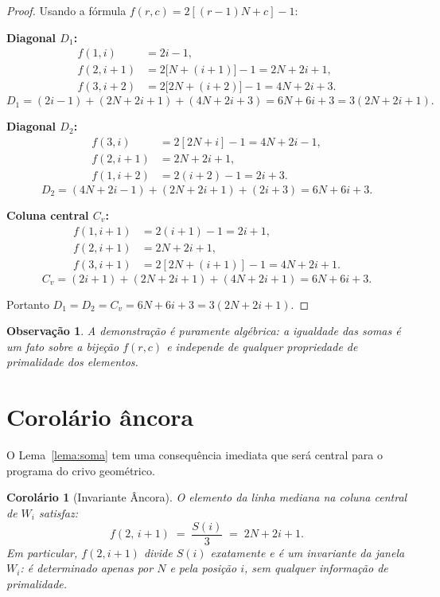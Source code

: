 \documentclass[12pt, a4paper]{article}
\newtheorem{corolario}[lema]{Corolário}
\newtheorem{observacao}[lema]{Observação}
\begin{document}
	\begin{proof}
		Usando a fórmula $f(r,c)=2[(r-1)N+c]-1$:
		
		\medskip\noindent\textbf{Diagonal $D_1$:}
		\begin{align*}
			f(1,i)   &= 2i-1,\\
			f(2,i+1) &= 2\bigl[N+(i+1)\bigr]-1 = 2N+2i+1,\\
			f(3,i+2) &= 2\bigl[2N+(i+2)\bigr]-1 = 4N+2i+3.
		\end{align*}
		\[
		D_1 = (2i-1)+(2N+2i+1)+(4N+2i+3) = 6N+6i+3 = 3(2N+2i+1).
		\]
		
		\medskip\noindent\textbf{Diagonal $D_2$:}
		\begin{align*}
			f(3,i)   &= 2[2N+i]-1 = 4N+2i-1,\\
			f(2,i+1) &= 2N+2i+1,\\
			f(1,i+2) &= 2(i+2)-1 = 2i+3.
		\end{align*}
		\[
		D_2 = (4N+2i-1)+(2N+2i+1)+(2i+3) = 6N+6i+3.
		\]
		
		\medskip\noindent\textbf{Coluna central $C_v$:}
		\begin{align*}
			f(1,i+1) &= 2(i+1)-1 = 2i+1,\\
			f(2,i+1) &= 2N+2i+1,\\
			f(3,i+1) &= 2[2N+(i+1)]-1 = 4N+2i+1.
		\end{align*}
		\[
		C_v = (2i+1)+(2N+2i+1)+(4N+2i+1) = 6N+6i+3.
		\]
		
		Portanto $D_1=D_2=C_v=6N+6i+3=3(2N+2i+1)$.
	\end{proof}
	
	\begin{observacao}
		A demonstração é puramente algébrica: a igualdade das somas é um fato sobre a
		bijeção $f(r,c)$ e independe de qualquer propriedade de primalidade dos elementos.
	\end{observacao}
	
	\section{Corolário âncora}
	\label{sec:ancora}
	
	O Lema~\ref{lema:soma} tem uma consequência imediata que será central para o programa
	do crivo geométrico.
	
	\begin{corolario}[Invariante Âncora]
		\label{cor:ancora}
		O elemento da linha mediana na coluna central de $W_i$ satisfaz:
		\[
		f(2,\,i+1) \;=\; \frac{S(i)}{3} \;=\; 2N+2i+1.
		\]
		Em particular, $f(2,i+1)$ divide $S(i)$ exatamente e é um \emph{invariante} da
		janela $W_i$: é determinado apenas por $N$ e pela posição $i$, sem qualquer
		informação de primalidade.
	\end{corolario}
	
\end{document}
